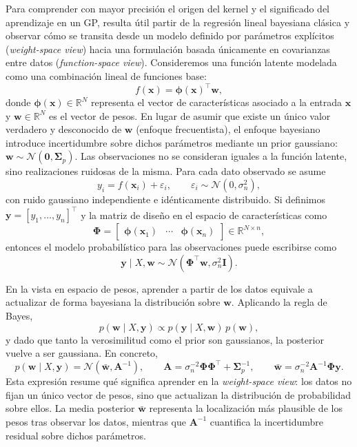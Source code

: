 Para comprender con mayor precisión el origen del kernel y el significado del aprendizaje en
un GP, resulta útil partir de la regresión lineal bayesiana clásica y observar
cómo se transita desde un modelo definido por parámetros explícitos (\emph{weight-space view}) hacia una formulación
basada únicamente en covarianzas entre datos (\emph{function-space view}). Consideremos una función latente modelada como una combinación lineal de funciones base:
\[
f(\bm{x}) = \bm{\phi}(\bm{x})^\top \bm{w},
\]
donde \(\bm{\phi}(\bm{x})\in\mathbb{R}^N\) representa el vector de características asociado a
la entrada \(\bm{x}\) y \(\bm{w}\in\mathbb{R}^N\) es el vector de pesos. En lugar de asumir que
existe un único valor verdadero y desconocido de \(\bm{w}\) (enfoque frecuentista), el enfoque bayesiano introduce
incertidumbre sobre dichos parámetros mediante un prior gaussiano:
\(
\bm{w}\sim\mathcal{N}(\bm{0},\bm{\Sigma}_p).
\) Las observaciones no se consideran iguales a la función latente, sino realizaciones ruidosas
de la misma. Para cada dato observado se asume
\[
y_i = f(\bm{x}_i)+\varepsilon_i,
\qquad
\varepsilon_i\sim\mathcal{N}(0,\sigma_n^2),
\]
con ruido gaussiano independiente e idénticamente distribuido. Si definimos
\(\bm{y}=[y_1,\dots,y_n]^\top\) y la matriz de diseño en el espacio de características como
\[
\bm{\Phi}=
\begin{bmatrix}
\bm{\phi}(\bm{x}_1) & \cdots & \bm{\phi}(\bm{x}_n)
\end{bmatrix}
\in\mathbb{R}^{N\times n},
\]
entonces el modelo probabilístico para las observaciones puede escribirse como
\[
\bm{y}\mid X,\bm{w}\sim\mathcal{N}(\bm{\Phi}^\top\bm{w},\sigma_n^2\bm{I}).
\]

En la vista en espacio de pesos, aprender a partir de los datos equivale a actualizar
de forma bayesiana la distribución sobre \(\bm{w}\). Aplicando la regla de Bayes,
\[
p(\bm{w}\mid X,\bm{y}) \propto p(\bm{y}\mid X,\bm{w})\,p(\bm{w}),
\]
y dado que tanto la verosimilitud como el prior son gaussianos, la posterior vuelve a ser
gaussiana. En concreto,
\[
p(\bm{w}\mid X,\bm{y})=
\mathcal{N}(\bar{\bm{w}},\bm{A}^{-1}),
\qquad
\bm{A}=\sigma_n^{-2}\bm{\Phi}\bm{\Phi}^\top+\bm{\Sigma}_p^{-1},
\qquad
\bar{\bm{w}}=\sigma_n^{-2}\bm{A}^{-1}\bm{\Phi}\bm{y}.
\]
Esta expresión resume qué significa aprender en la \emph{weight-space view}: los datos no
fijan un único vector de pesos, sino que actualizan la distribución de probabilidad sobre
ellos. La media posterior \(\bar{\bm{w}}\) representa la localización más plausible de los
pesos tras observar los datos, mientras que \(\bm{A}^{-1}\) cuantifica la incertidumbre
residual sobre dichos parámetros.

